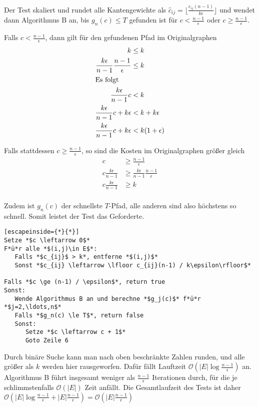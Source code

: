 \documentclass{article}
\begin{document}
Der Test skaliert und rundet alle Kantengewichte als $\hat{c}_{ij} =
\lfloor\frac{c_{ij} (n-1)}{k\epsilon}\rfloor$ und wendet dann Algorithmus B an,
bis $g_n(c) \le T$ gefunden ist für $c < \frac{n-1}{\epsilon}$ oder $c \ge
\frac{n-1}{\epsilon}$.

Falls $c < \frac{n-1}{\epsilon}$, dann gilt für den gefundenen Pfad im
Originalgraphen
\begin{align*}
   k & \le k \\
   \frac{k\epsilon}{n-1} \frac{n-1}{\epsilon} & \le k \\
   \intertext{Es folgt}
   \frac{k\epsilon}{n-1} c & < k \\
   \frac{k\epsilon}{n-1} c + k\epsilon & < k + k\epsilon\\
   \frac{k\epsilon}{n-1} c + k\epsilon & < k(1+\epsilon)\\
\end{align*}

Falls stattdessen $c \ge \frac{n-1}{\epsilon}$, so sind die Kosten im
Originalgraphen größer gleich
\begin{align*}
   c & \ge \frac{n-1}{\epsilon} \\
   c \frac{k\epsilon}{n-1} & \ge \frac{k\epsilon}{n-1}\frac{n-1}{\epsilon} \\
   c \frac{k\epsilon}{n-1} & \ge k \\
\end{align*}

Zudem ist $g_n(c)$ der schnellste $T$-Pfad, alle anderen sind also höchstens so
schnell.  Somit leistet der Test das Geforderte.

\begin{lstlisting}[escapeinside={*}{*}]
Setze *$c \leftarrow 0$*
F*ü*r alle *$(i,j)\in E$*:
   Falls *$c_{ij}$ > k*, entferne *$(i,j)$*
   Sonst *$c_{ij} \leftarrow \lfloor c_{ij}(n-1) / k\epsilon\rfloor$*

Falls *$c \ge (n-1) / \epsilon$*, return true
Sonst: 
   Wende Algorithmus B an und berechne *$g_j(c)$* f*ü*r *$j=2,\ldots,n$*
   Falls *$g_n(c) \le T$*, return false
   Sonst:
      Setze *$c \leftarrow c + 1$*
      Goto Zeile 6
\end{lstlisting}
 Durch binäre Suche kann man nach oben beschränkte Zahlen runden, und alle
 größer als $k$ werden hier rausgeworfen. Dafür fällt Lauftzeit
 $\mathcal{O}\left(|E|\log{\frac{n-1}{\epsilon}}\right)$ an. Algorithmus B führt insgesamt
 weniger als $\frac{n-1}{\epsilon}$ Iterationen durch, für die je
 schlimmstenfalls $\mathcal{O}\left(|E|\right)$ Zeit anfällt. Die Gesamtlaufzeit des Tests
 ist daher $\mathcal{O}\left(|E|\log{\frac{n-1}{\epsilon}} + |E|\frac{n-1}{\epsilon}\right)
 = \mathcal{O}\left(|E|\frac{n-1}{\epsilon}\right)
$
\end{document}
